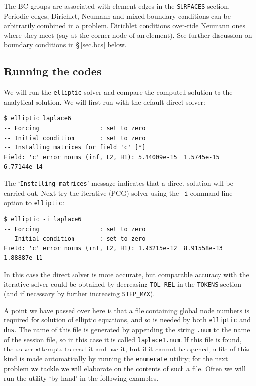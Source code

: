\documentclass[11pt]{report}
\begin{document}
The BC groups are associated with element edges in the
\texttt{SURFACES} section.  Periodic edges, Dirichlet, Neumann and
mixed boundary conditions can be arbitrarily combined in a problem.
Dirichlet conditions over-ride Neumann ones where they meet (say at
the corner node of an element). See further discussion on boundary
conditions in \S\,\ref{sec.bcs} below.

\subsection{Running the codes}
\label{sec.runell}

We will run the \verb|elliptic| solver and compare the computed
solution to the analytical solution.  We will first run with the
default direct solver: 
%
{\small
\begin{verbatim}
$ elliptic laplace6
-- Forcing                 : set to zero
-- Initial condition       : set to zero
-- Installing matrices for field 'c' [*]
Field: 'c' error norms (inf, L2, H1): 5.44009e-15  1.5745e-15  6.77144e-14
\end{verbatim}
}

The `\verb|Installing matrices|' message indicates that a direct
solution will be carried out.  Next try the iterative (PCG) solver
using the \verb+-i+ command-line option to \texttt{elliptic}:
%
{\small
\begin{verbatim}
$ elliptic -i laplace6
-- Forcing                 : set to zero
-- Initial condition       : set to zero
Field: 'c' error norms (inf, L2, H1): 1.93215e-12  8.91558e-13  1.88887e-11
\end{verbatim}
}
\noindent
In this case the direct solver is more accurate, but comparable
accuracy with the iterative solver could be obtained by decreasing
\verb+TOL_REL+ in the \texttt{TOKENS} section (and if necessary by
further increasing \verb+STEP_MAX+).

A point we have passed over here is that a file containing global node
numbers is required for solution of elliptic equations, and so is
needed by both \verb|elliptic| and \verb|dns|.  The name of this file
is generated by appending the string \verb|.num| to the name of the
session file, so in this case it is called \verb|laplace1.num|.  If
this file is found, the solver attempts to read it and use it, but if
it cannot be opened, a file of this kind is made automatically by
running the \verb|enumerate| utility; for the next problem we tackle
we will elaborate on the contents of such a file.  Often we will run
the utility `by hand' in the following examples.
\end{document}
